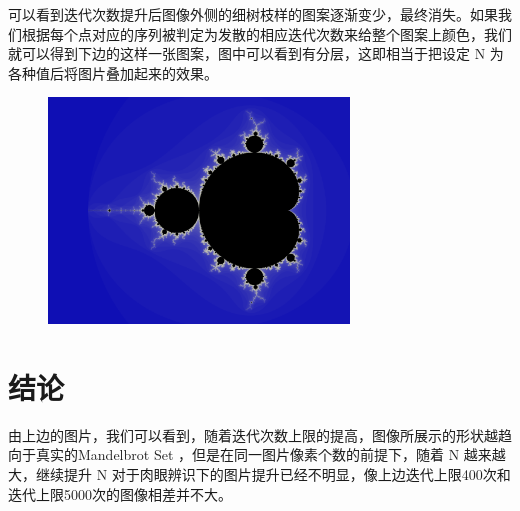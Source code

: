 \documentclass{ctexart}
\begin{document}
\indent 可以看到迭代次数提升后图像外侧的细树枝样的图案逐渐变少，最终消失。如果我们根据每个点对应的序列被判定为发散的相应迭代次数来给整个图案上颜色，我们就可以得到下边的这样一张图案，图中可以看到有分层，这即相当于把设定 N 为各种值后将图片叠加起来的效果。\\
\begin{figure}[H]
\centering
	\includegraphics[width=8cm,height=6cm]{./examples/res_color_400.png}
\caption{\label{Two}}
\end{figure}

\section{结论}
\indent 由上边的图片，我们可以看到，随着迭代次数上限的提高，图像所展示的形状越趋向于真实的Mandelbrot Set ，但是在同一图片像素个数的前提下，随着 N 越来越大，继续提升 N 对于肉眼辨识下的图片提升已经不明显，像上边迭代上限400次和迭代上限5000次的图像相差并不大。

\end{document}
